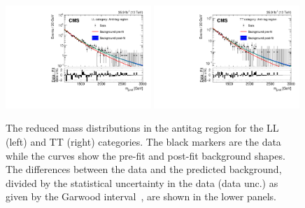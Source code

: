 \begin{figure}
\centering
\includegraphics[width=0.49\textwidth]{B2G-16-026/Figure_007-a.pdf}
\includegraphics[width=0.49\textwidth]{B2G-16-026/Figure_007-b.pdf}
  \caption{The reduced mass \mjjs distributions in the antitag region for the LL
    (left) and TT (right) categories. The black markers are the data
    while the curves show the pre-fit and post-fit background
    shapes.
    The differences between the data and the predicted
  background, divided by the statistical uncertainty in the data
  (data unc.) as given by the Garwood interval~\cite{Garwood}, are shown in the lower panels.}
\label{fig:AABH_AT}
\end{figure}

